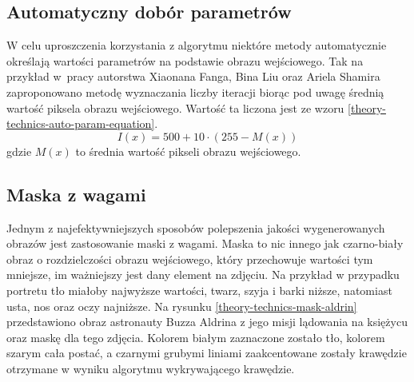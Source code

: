         \subsection{Automatyczny dobór parametrów}  \label{theory-technics-auto-param}
        W celu uproszczenia korzystania z algorytmu niektóre metody automatycznie określają wartości parametrów na podstawie obrazu wejściowego. Tak na przykład w~pracy autorstwa Xiaonana Fanga, Bina Liu oraz Ariela Shamira \cite{article-string-art-xiaonan} zaproponowano metodę wyznaczania liczby iteracji biorąc pod uwagę średnią wartość piksela obrazu wejściowego. Wartość ta liczona jest ze wzoru \ref{theory-technics-auto-param-equation}. 
        \begin{equation} \label{theory-technics-auto-param-equation}
            I(x) = 500 + 10 \cdot (255 - M(x))
        \end{equation}
        gdzie \(M(x)\) to średnia wartość pikseli obrazu wejściowego.
        
        \subsection{Maska z wagami}
        Jednym z najefektywniejszych sposobów polepszenia jakości wygenerowanych obrazów jest zastosowanie maski z wagami. Maska to nic innego jak czarno-biały obraz o rozdzielczości obrazu wejściowego, który przechowuje wartości tym mniejsze, im ważniejszy jest dany element na zdjęciu. Na przykład w przypadku portretu tło miałoby najwyższe wartości, twarz, szyja i barki niższe, natomiast usta, nos oraz oczy najniższe. Na rysunku \ref{theory-technics-mask-aldrin} przedstawiono obraz astronauty Buzza Aldrina z jego misji lądowania na księżycu oraz maskę dla tego zdjęcia. Kolorem białym zaznaczone zostało tło, kolorem szarym cała postać, a czarnymi grubymi liniami zaakcentowane zostały krawędzie otrzymane w wyniku algorytmu wykrywającego krawędzie.
        
